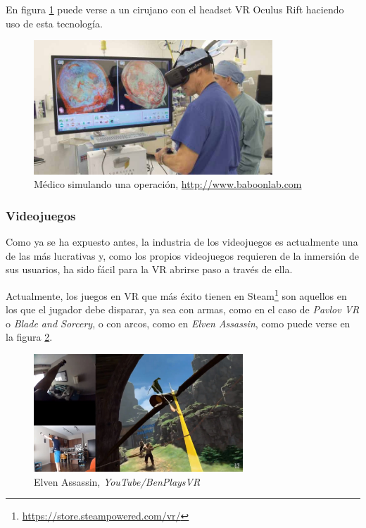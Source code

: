 En figura \ref{fig:medico} puede verse a un cirujano con el headset \acs{VR} Oculus Rift haciendo uso de esta tecnología.

\begin{figure}[!h]
\begin{center}
\includegraphics[width=0.8\textwidth]{imagenes/2/medicina.jpg}
\caption{Médico simulando una operación, \url{http://www.baboonlab.com}}
\label{fig:medico}
\end{center}
\end{figure}
 
\subsubsection{Videojuegos}

Como ya se ha expuesto antes, la industria de los videojuegos es actualmente una de las más lucrativas y, como los propios videojuegos requieren de la inmersión de sus usuarios, ha sido fácil para la \acs{VR} abrirse paso a través de ella.

Actualmente, los juegos en \acs{VR} que más éxito tienen en Steam\footnote{\url{https://store.steampowered.com/vr/}} son aquellos en los que el jugador debe disparar, ya sea con armas, como en el caso de \textit{Pavlov VR} o \textit{Blade and Sorcery}, o con arcos, como en \textit{Elven Assassin}, como puede verse en la figura \ref{fig:elven-assassin}.

\begin{figure}[!h]
\begin{center}
\includegraphics[width=0.7\textwidth]{imagenes/2/elven-assassin.jpg}
\caption{Elven Assassin, \textit{YouTube/BenPlaysVR}}
\label{fig:elven-assassin}
\end{center}
\end{figure}


